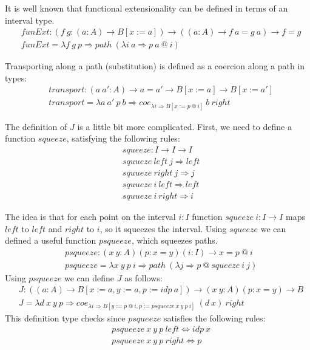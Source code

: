 \documentclass{amsart}
\theoremstyle{definition}
\theoremstyle{remark}
\newcommand{\red}{\Rightarrow}
\newcommand{\deq}{\Leftrightarrow}
\numberwithin{figure}{section}
\begin{document}
It is well known that functional extensionality can be defined in terms of an interval type.
\begin{align*}
    & funExt : (f\ g : (a : A) \to B[x := a]) \to ((a : A) \to f\ a = g\ a) \to f = g \\
    & funExt = \lambda f\ g\ p \red path\ (\lambda i\ a \red p\ a\ @\ i)
\end{align*}

Transporting along a path (substitution) is defined as a coercion along a path in types:
\begin{align*}
    & transport : (a\ a' : A) \to a = a' \to B[x := a] \to B[x := a'] \\
    & transport = \lambda a\ a'\ p\ b \red coe_{\lambda i \red B[x := p\ @\ i]}\ b\ right
\end{align*}

The definition of $J$ is a little bit more complicated.
First, we need to define a function $squeeze$, satisfying the following rules:
\begin{align*}
    & squeeze : I \to I \to I \\
    & squueze\ left\ j \red left \\
    & squueze\ right\ j \red j \\
    & squueze\ i\ left \red left \\
    & squueze\ i\ right \red i
\end{align*}

The idea is that for each point on the interval $i : I$ function $squeeze\ i : I \to I$ maps $left$ to $left$ and $right$ to $i$, so it squeezes the interval.
Using $squeeze$ we can defined a useful function $psqueeze$, which squeezes paths.
\begin{align*}
    & psqueeze : (x\ y : A) (p : x = y) (i : I) \to x = p\ @\ i \\
    & psqueeze = \lambda x\ y\ p\ i \red path\ (\lambda j \red p\ @\ squeeze\ i\ j)
\end{align*}
Using $psqueeze$ we can define $J$ as follows:
\begin{align*}
    & J : ((a : A) \to B[x := a, y := a, p := idp\ a]) \to (x\ y : A) (p : x = y) \to B \\
    & J = \lambda d\ x\ y\ p \red coe_{\lambda i \red B[y := p\ @\ i, p := psqueeze\ x\ y\ p\ i]}\ (d\ x)\ right
\end{align*}
This definition type checks since $psqueeze$ satisfies the following rules:
\begin{align*}
    & psqueeze\ x\ y\ p\ left \deq idp\ x \\
    & psqueeze\ x\ y\ p\ right \deq p
\end{align*}
\end{document}
